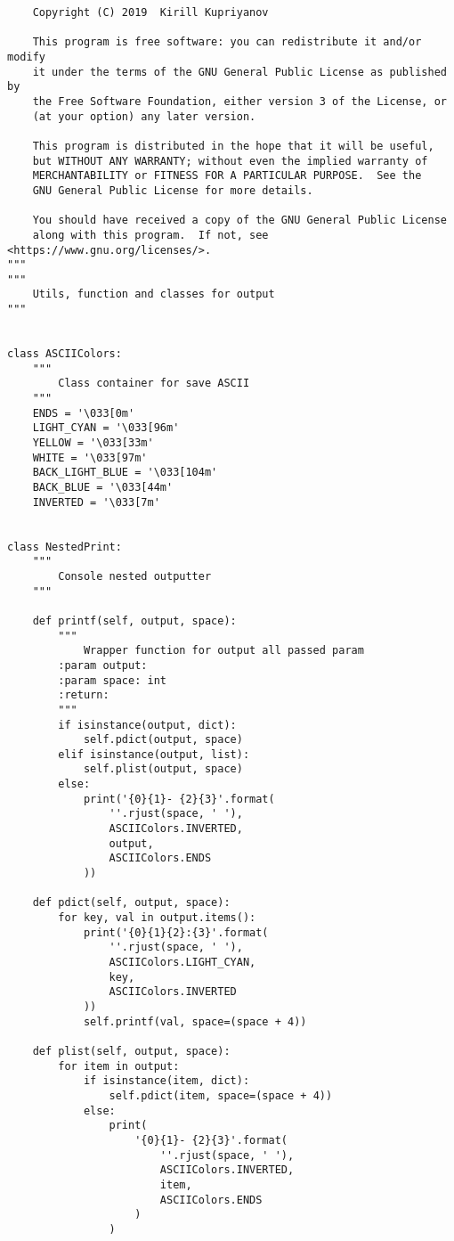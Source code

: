 \begin{lstlisting}
    Copyright (C) 2019  Kirill Kupriyanov

    This program is free software: you can redistribute it and/or modify
    it under the terms of the GNU General Public License as published by
    the Free Software Foundation, either version 3 of the License, or
    (at your option) any later version.

    This program is distributed in the hope that it will be useful,
    but WITHOUT ANY WARRANTY; without even the implied warranty of
    MERCHANTABILITY or FITNESS FOR A PARTICULAR PURPOSE.  See the
    GNU General Public License for more details.

    You should have received a copy of the GNU General Public License
    along with this program.  If not, see <https://www.gnu.org/licenses/>.
"""
"""
    Utils, function and classes for output
"""


class ASCIIColors:
    """
        Class container for save ASCII
    """
    ENDS = '\033[0m'
    LIGHT_CYAN = '\033[96m'
    YELLOW = '\033[33m'
    WHITE = '\033[97m'
    BACK_LIGHT_BLUE = '\033[104m'
    BACK_BLUE = '\033[44m'
    INVERTED = '\033[7m'


class NestedPrint:
    """
        Console nested outputter
    """

    def printf(self, output, space):
        """
            Wrapper function for output all passed param
        :param output:
        :param space: int
        :return:
        """
        if isinstance(output, dict):
            self.pdict(output, space)
        elif isinstance(output, list):
            self.plist(output, space)
        else:
            print('{0}{1}- {2}{3}'.format(
                ''.rjust(space, ' '),
                ASCIIColors.INVERTED,
                output,
                ASCIIColors.ENDS
            ))

    def pdict(self, output, space):
        for key, val in output.items():
            print('{0}{1}{2}:{3}'.format(
                ''.rjust(space, ' '),
                ASCIIColors.LIGHT_CYAN,
                key,
                ASCIIColors.INVERTED
            ))
            self.printf(val, space=(space + 4))

    def plist(self, output, space):
        for item in output:
            if isinstance(item, dict):
                self.pdict(item, space=(space + 4))
            else:
                print(
                    '{0}{1}- {2}{3}'.format(
                        ''.rjust(space, ' '),
                        ASCIIColors.INVERTED,
                        item,
                        ASCIIColors.ENDS
                    )
                )



\end{lstlisting}
